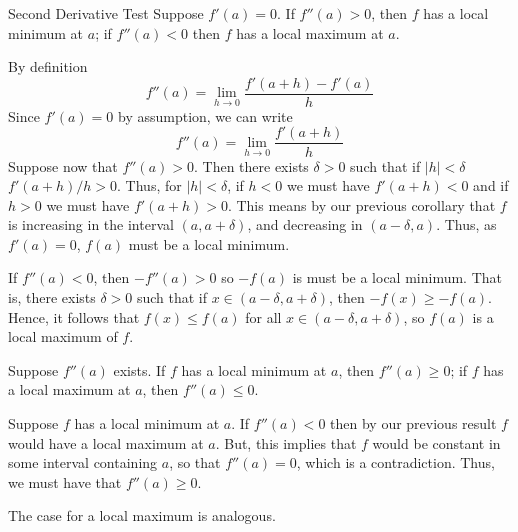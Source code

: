 \documentclass[12pt]{report}
\begin{document}
\begin{thm}{Second Derivative Test}{}
    Suppose $f'(a) = 0$. If $f''(a) > 0$, then $f$ has a local minimum at $a$; if $f''(a) < 0$ then $f$ has a local maximum at $a$.
\end{thm}
\begin{proof*}{}{}
    By definition \begin{equation*}
        f''(a) = \lim\limits_{h\rightarrow 0} \frac{f'(a+h) - f'(a)}{h}
    \end{equation*}
    Since $f'(a) = 0$ by assumption, we can write \begin{equation*}
        f''(a) = \lim\limits_{h\rightarrow 0}\frac{f'(a+h)}{h}
    \end{equation*}
    Suppose now that $f''(a) > 0$. Then there exists $\delta >0$ such that if $|h| < \delta$ $f'(a+h)/h > 0$. Thus, for $|h| < \delta$, if $h < 0$ we must have $f'(a+h) < 0$ and if $h > 0$ we must have $f'(a+h) > 0$. This means by our previous corollary that $f$ is increasing in the interval $(a,a+\delta)$, and decreasing in $(a-\delta, a)$. Thus, as $f'(a) = 0$, $f(a)$ must be a local minimum.

    If $f''(a) < 0$, then $-f''(a) > 0$ so $-f(a)$ is must be a local minimum. That is, there exists $\delta > 0$ such that if $x \in (a - \delta, a + \delta)$, then $-f(x) \geq -f(a)$. Hence, it follows that $f(x) \leq f(a)$ for all $x \in (a-\delta,a+\delta)$, so $f(a)$ is a local maximum of $f$.
\end{proof*}


\begin{thm}{}{}
    Suppose $f''(a)$ exists. If $f$ has a local minimum at $a$, then $f''(a) \geq 0$; if $f$ has a local maximum at $a$, then $f''(a) \leq 0$.
\end{thm}
\begin{proof*}{}{}
    Suppose $f$ has a local minimum at $a$. If $f''(a) < 0$ then by our previous result $f$ would have a local maximum at $a$. But, this implies that $f$ would be constant in some interval containing $a$, so that $f''(a) = 0$, which is a contradiction. Thus, we must have that $f''(a) \geq 0$.

    The case for a local maximum is analogous.
\end{proof*}
\end{document}
